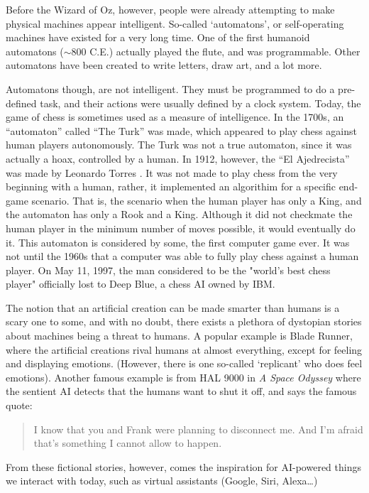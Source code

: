\documentclass[letterpaper,12pt]{article}
\begin{document}
Before the Wizard of Oz, however, people were already attempting to make physical machines
appear intelligent. So-called `automatons', or self-operating machines have existed for
a very long time. One of the first humanoid automatons ($\sim$800 C.E.) actually played the flute, and was programmable.\cite{automaton}
Other automatons have been created to write letters, draw art, and a lot more.

Automatons though, are not intelligent.
They must be programmed to do a pre-defined task, and their actions were
usually defined by a clock system.
Today, the game of chess is sometimes used as a measure of intelligence.
In the 1700s, an ``automaton'' called ``The Turk'' was made, which appeared to play chess
against human players autonomously\cite{turk}. The Turk was not a true automaton, since
it was actually a hoax, controlled by a human. In 1912, however, the ``El Ajedrecista''
was made by Leonardo Torres \cite{actualchessmachine}. It was not made to play chess from the
very beginning with a human, rather, it implemented an algorithim for a
specific end-game scenario. That is, the scenario when the human player has
only a King, and the automaton has only a Rook and a King. Although it did not
checkmate the human player in the minimum number of moves possible, it would
eventually do it.
This automaton is considered by some, the first computer game ever.
It was not until the 1960s that a computer was able to fully play chess against a human player.\cite{computerchess}
On May 11, 1997, the man considered to be the "world's best chess player" officially lost to Deep Blue,
a chess AI owned by IBM.\cite{computerchess}


The notion that an artificial creation can be made smarter than humans is a scary one to some,
and with no doubt, there exists a plethora of dystopian stories about machines being a threat to humans.
A popular example is Blade Runner, where the artificial creations rival humans
at almost everything, except for feeling and displaying emotions. (However, there is one so-called `replicant'
who does feel emotions)\cite{bladerunner}. Another famous example is from HAL 9000 in \textit{A Space Odyssey}
where the sentient AI detects that the humans want to shut it off, and says the
famous quote: \cite{HAL} 
\begin{quote}
   I know that you and Frank were planning to disconnect me. And I'm afraid that's something I cannot allow to happen.
\end{quote}

From these fictional stories, however, comes the inspiration for AI-powered things we interact with
today, such as virtual assistants (Google, Siri, Alexa\dots) 
\end{document}
